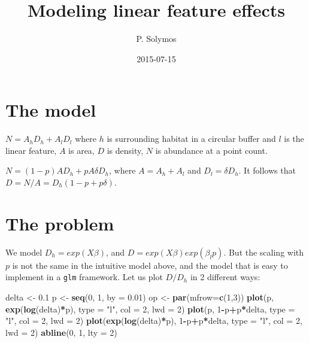 \documentclass[]{article}
\title{Modeling linear feature effects}
\author{P. Solymos}
\date{2015-07-15}
\newenvironment{Shaded}{\begin{snugshade}}{\end{snugshade}}
\newcommand{\KeywordTok}[1]{\textcolor[rgb]{0.13,0.29,0.53}{\textbf{#1}}}
\newcommand{\DataTypeTok}[1]{\textcolor[rgb]{0.13,0.29,0.53}{#1}}
\newcommand{\DecValTok}[1]{\textcolor[rgb]{0.00,0.00,0.81}{#1}}
\newcommand{\FloatTok}[1]{\textcolor[rgb]{0.00,0.00,0.81}{#1}}
\newcommand{\StringTok}[1]{\textcolor[rgb]{0.31,0.60,0.02}{#1}}
\newcommand{\OperatorTok}[1]{\textcolor[rgb]{0.81,0.36,0.00}{\textbf{#1}}}
\newcommand{\NormalTok}[1]{#1}
\begin{document}
\maketitle

\section{The model}\label{the-model}

\(N = A_h D_h + A_l D_l\) where \(h\) is surrounding habitat in a
circular buffer and \(l\) is the linear feature, \(A\) is area, \(D\) is
density, \(N\) is abundance at a point count.

\(N = (1-p) A D_h + p A \delta D_h\), where \(A=A_h + A_l\) and
\(D_l = \delta D_h\). It follows that
\(D = N/A = D_h (1 - p + p \delta)\).

\section{The problem}\label{the-problem}

We model \(D_h = exp(X \beta)\), and
\(D = exp(X \beta) exp(\beta_l p)\). But the scaling with \(p\) is not
the same in the intuitive model above, and the model that is easy to
implement in a \texttt{glm} framework. Let us plot \(D/D_h\) in 2
different ways:

\begin{Shaded}
\begin{Highlighting}[]
\NormalTok{delta <-}\StringTok{ }\FloatTok{0.1}
\NormalTok{p <-}\StringTok{ }\KeywordTok{seq}\NormalTok{(}\DecValTok{0}\NormalTok{, }\DecValTok{1}\NormalTok{, }\DataTypeTok{by =} \FloatTok{0.01}\NormalTok{)}
\NormalTok{op <-}\StringTok{ }\KeywordTok{par}\NormalTok{(}\DataTypeTok{mfrow=}\KeywordTok{c}\NormalTok{(}\DecValTok{1}\NormalTok{,}\DecValTok{3}\NormalTok{))}
\KeywordTok{plot}\NormalTok{(p, }\KeywordTok{exp}\NormalTok{(}\KeywordTok{log}\NormalTok{(delta)}\OperatorTok{*}\NormalTok{p), }\DataTypeTok{type =} \StringTok{"l"}\NormalTok{, }\DataTypeTok{col =} \DecValTok{2}\NormalTok{, }\DataTypeTok{lwd =} \DecValTok{2}\NormalTok{)}
\KeywordTok{plot}\NormalTok{(p, }\DecValTok{1}\OperatorTok{-}\NormalTok{p}\OperatorTok{+}\NormalTok{p}\OperatorTok{*}\NormalTok{delta, }\DataTypeTok{type =} \StringTok{"l"}\NormalTok{, }\DataTypeTok{col =} \DecValTok{2}\NormalTok{, }\DataTypeTok{lwd =} \DecValTok{2}\NormalTok{)}
\KeywordTok{plot}\NormalTok{(}\KeywordTok{exp}\NormalTok{(}\KeywordTok{log}\NormalTok{(delta)}\OperatorTok{*}\NormalTok{p), }\DecValTok{1}\OperatorTok{-}\NormalTok{p}\OperatorTok{+}\NormalTok{p}\OperatorTok{*}\NormalTok{delta, }\DataTypeTok{type =} \StringTok{"l"}\NormalTok{, }\DataTypeTok{col =} \DecValTok{2}\NormalTok{, }\DataTypeTok{lwd =} \DecValTok{2}\NormalTok{)}
\KeywordTok{abline}\NormalTok{(}\DecValTok{0}\NormalTok{, }\DecValTok{1}\NormalTok{, }\DataTypeTok{lty =} \DecValTok{2}\NormalTok{)}
\end{Highlighting}
\end{Shaded}
\end{document}
